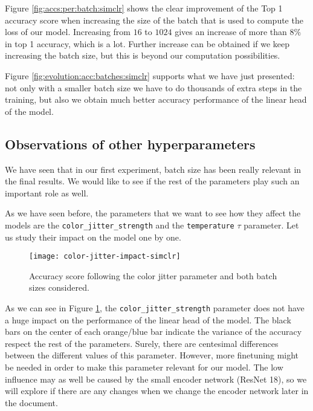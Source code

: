Figure \ref{fig:accs:per:batch:simclr} shows the clear improvement of the Top 1 accuracy score when increasing the size of the batch that is used to compute the loss of our model. Increasing from $16$ to $1024$ gives an increase of more than $8\%$ in top 1 accuracy, which is a lot. Further increase can be obtained if we keep increasing the batch size, but this is beyond our computation possibilities.

Figure \ref{fig:evolution:acc:batches:simclr} supports what we have just presented: not only with a smaller batch size we have to do thousands of extra steps in the training, but also we obtain much better accuracy performance of the linear head of the model.

\subsection*{Observations of other hyperparameters}

We have seen that in our first experiment, batch size has been really relevant in the final results. We would like to see if the rest of the parameters play such an important role as well. 

As we have seen before, the parameters that we want to see how they affect the models are the \lstinline{color_jitter_strength} and the \lstinline{temperature} $\tau$ parameter. Let us study their impact on the model one by one. 

\begin{figure}[H] 
    \centering
    \texttt{[image: color-jitter-impact-simclr]}%
    
    \caption{Accuracy score following the color jitter parameter and both batch sizes considered.}
    
    \label{exp:simclr:colorjitter:impact}
\end{figure}

As we can see in Figure \ref{exp:simclr:colorjitter:impact}, the \lstinline{color_jitter_strength} parameter does not have a huge impact on the performance of the linear head of the model. The black bars on the center of each orange/blue bar indicate the variance of the accuracy respect the rest of the parameters. Surely, there are centesimal differences between the different values of this parameter. However, more finetuning might be needed in order to make this parameter relevant for our model. The low influence may as well be caused by the small encoder network (ResNet 18), so we will explore if there are any changes when we change the encoder network later in the document.

